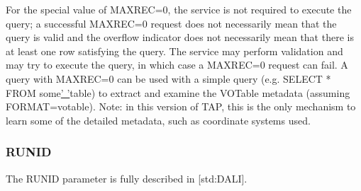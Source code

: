 \documentclass[11pt,letter]{ivoa}
\begin{document}
For the special value of MAXREC=0, the service is not required to execute the 
query; a successful  MAXREC=0 request does not necessarily mean that the query 
is valid and the overflow indicator does not necessarily mean that there is at 
least one row satisfying the query. The service may perform validation and may 
try to execute the query, in which case a MAXREC=0 request can fail. A query 
with MAXREC=0 can be used with a simple query (e.g. SELECT * FROM  
some\underline{' '}table) to extract and examine the VOTable metadata (assuming 
FORMAT=votable). Note: in this version of TAP, this is the only mechanism to 
learn some of the detailed metadata, such as coordinate systems used.

\subsubsection{RUNID}
The RUNID parameter is fully described in [std:DALI].
\end{document}
